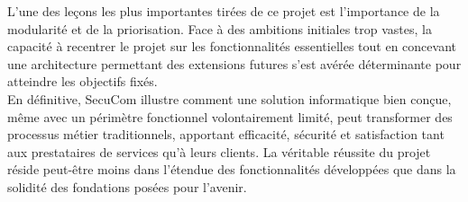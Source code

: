 L'une des leçons les plus importantes tirées de ce projet est l'importance de la modularité et de la priorisation. Face à des ambitions initiales trop vastes, la capacité à recentrer le projet sur les fonctionnalités essentielles tout en concevant une architecture permettant des extensions futures s'est avérée déterminante pour atteindre les objectifs fixés.\\

En définitive, SecuCom illustre comment une solution informatique bien conçue, même avec un périmètre fonctionnel volontairement limité, peut transformer des processus métier traditionnels, apportant efficacité, sécurité et satisfaction tant aux prestataires de services qu'à leurs clients. La véritable réussite du projet réside peut-être moins dans l'étendue des fonctionnalités développées que dans la solidité des fondations posées pour l'avenir.\\
